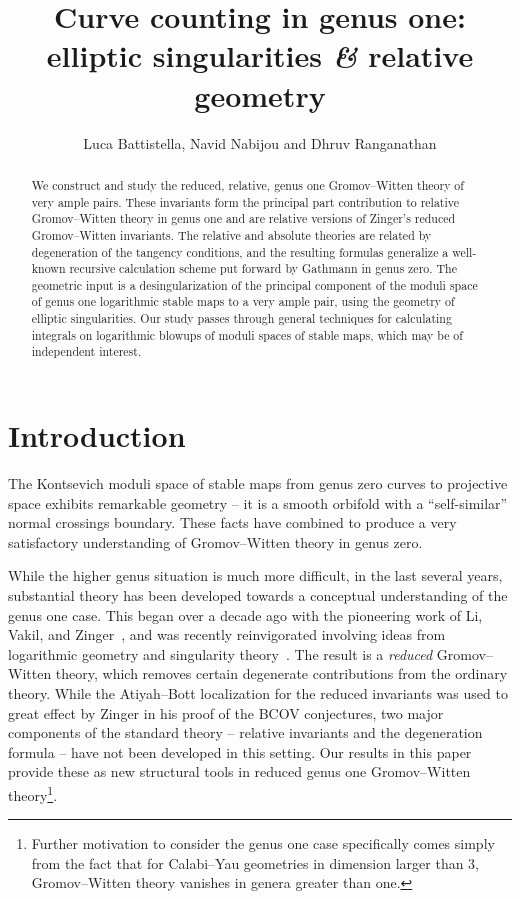 \documentclass[11pt]{amsart}
\title[Curve counting in genus one: elliptic singularities and relative geometry]{Curve counting in genus one: elliptic singularities {\it \&} relative geometry}
\author{Luca Battistella, Navid Nabijou and Dhruv Ranganathan}
\date{\thismonthyear}
\theoremstyle{definition}
\theoremstyle{definition}
\begin{document}
\begin{abstract}
We construct and study the reduced, relative, genus one Gromov--Witten theory of very ample pairs. These invariants form the principal part contribution to relative Gromov--Witten theory in genus one and are relative versions of Zinger's reduced Gromov--Witten invariants. The relative and absolute theories are related by degeneration of the tangency conditions, and the resulting formulas generalize a well-known recursive calculation scheme put forward by Gathmann in genus zero. {The geometric input is a desingularization of the principal component of the moduli space of genus one logarithmic stable maps to a very ample pair, using the geometry of elliptic singularities. Our study passes through general techniques for calculating integrals on logarithmic blowups of moduli spaces of stable maps, which may be of independent interest.}
\end{abstract}

\maketitle

\appendixtitletocoff
\tableofcontents

\setcounter{section}{-1}
\section{Introduction}

The Kontsevich moduli space of stable maps from genus zero curves to projective space exhibits remarkable geometry -- it is a smooth orbifold with a ``self-similar'' normal crossings boundary. These facts have combined to produce a very {satisfactory} understanding of Gromov--Witten theory in genus zero. 

While the higher genus situation is much more difficult, in the last several years, substantial theory has been developed towards a conceptual understanding of the genus one case. This began over a decade ago with the pioneering work of Li, Vakil, and Zinger~\cite{redgone,VZ,LZ,lz2,zingerstvsred,zingred}, and was recently reinvigorated involving ideas from logarithmic geometry and singularity theory~\cite{BCM18,CM18,HL,RSPW,RSPW2,SMY1,VISC}. The result is a \textit{reduced} Gromov--Witten theory, which removes certain degenerate contributions from the ordinary theory. While the Atiyah--Bott localization for the reduced invariants was used to great effect by Zinger in his proof of the BCOV conjectures, two major components of the standard theory -- relative invariants and the degeneration formula -- have not been developed in this setting. Our results in this paper provide these as new {structural} tools in reduced genus one Gromov--Witten theory\footnote{Further motivation to consider the genus one case specifically comes simply from the fact that for Calabi--Yau geometries in dimension larger than $3$, Gromov--Witten theory vanishes in genera greater than one.}. 
\end{document}
